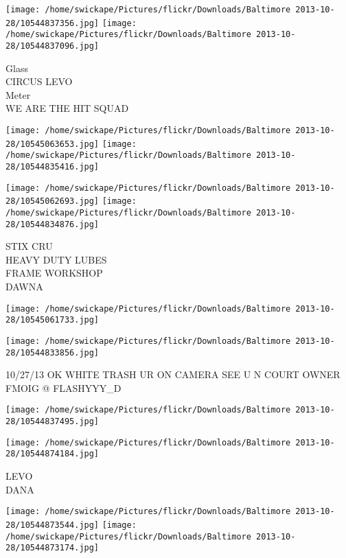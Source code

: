 \documentclass[10pt,letterpaper]{article}
\begin{document}
\texttt{[image: /home/swickape/Pictures/flickr/Downloads/Baltimore 2013-10-28/10544837356.jpg]}
\texttt{[image: /home/swickape/Pictures/flickr/Downloads/Baltimore 2013-10-28/10544837096.jpg]}

Glass\\
CIRCUS LEVO\\
Meter\\
WE ARE THE HIT SQUAD\\
\pagebreak

\texttt{[image: /home/swickape/Pictures/flickr/Downloads/Baltimore 2013-10-28/10545063653.jpg]}
\texttt{[image: /home/swickape/Pictures/flickr/Downloads/Baltimore 2013-10-28/10544835416.jpg]}

\texttt{[image: /home/swickape/Pictures/flickr/Downloads/Baltimore 2013-10-28/10545062693.jpg]}
\texttt{[image: /home/swickape/Pictures/flickr/Downloads/Baltimore 2013-10-28/10544834876.jpg]}

STIX CRU\\
HEAVY DUTY LUBES\\
FRAME WORKSHOP\\
DAWNA\\
\pagebreak

\texttt{[image: /home/swickape/Pictures/flickr/Downloads/Baltimore 2013-10-28/10545061733.jpg]}

\vspace{0.25in}
\texttt{[image: /home/swickape/Pictures/flickr/Downloads/Baltimore 2013-10-28/10544833856.jpg]}

10/27/13 OK WHITE TRASH UR ON CAMERA SEE U N COURT OWNER\\
FMOIG @ FLASHYYY\_D\\
\pagebreak

\texttt{[image: /home/swickape/Pictures/flickr/Downloads/Baltimore 2013-10-28/10544837495.jpg]}

\vspace{0.25in}
\texttt{[image: /home/swickape/Pictures/flickr/Downloads/Baltimore 2013-10-28/10544874184.jpg]}

LEVO\\
DANA\\
\pagebreak

\texttt{[image: /home/swickape/Pictures/flickr/Downloads/Baltimore 2013-10-28/10544873544.jpg]}
\texttt{[image: /home/swickape/Pictures/flickr/Downloads/Baltimore 2013-10-28/10544873174.jpg]}
\end{document}
